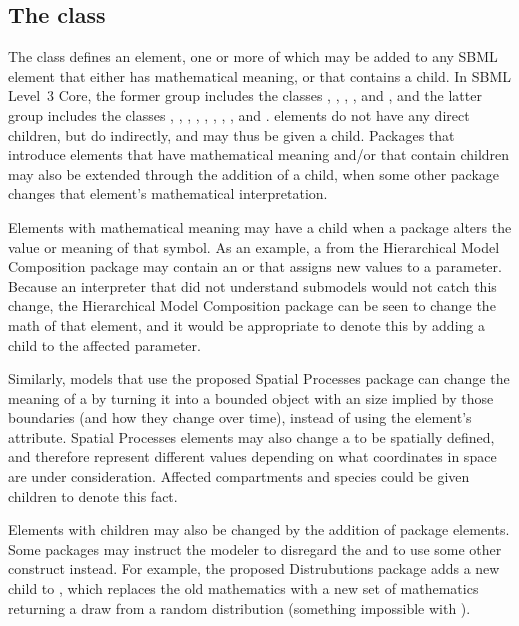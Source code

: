 \subsection{The  class}
\label{changedMath-class}

The \ChangedMath class defines an element, one or more of which may be added to any SBML element that either has mathematical meaning, or that contains a \Math child.  In SBML Level~3 Core, the former group includes the classes \Compartment, \Parameter, \Reaction, \Species, and \SpeciesReference, and the latter group includes the classes \Constraint, \Delay, \EventAssignment, \FunctionDefinition, \InitialAssignment, \KineticLaw, \Priority, \Rule, and \Trigger.  \Event elements do not have any direct \Math children, but do indirectly, and may thus be given a \ChangedMath child.  Packages that introduce elements that have mathematical meaning and/or that contain \Math children may also be extended through the addition of a \ChangedMath child, when some other package changes that element's mathematical interpretation.

Elements with mathematical meaning may have a \ChangedMath child when a package alters the value or meaning of that symbol.  As an example, a \Submodel from the Hierarchical Model Composition package may contain an \Event or \Rule that assigns new values to a parameter.  Because an interpreter that did not understand submodels would not catch this change, the Hierarchical Model Composition package can be seen to change the math of that element, and it would be appropriate to denote this by adding a \ChangedMath child to the affected parameter.

Similarly, models that use the proposed Spatial Processes package can change the meaning of a \Compartment by turning it into a bounded object with an size implied by those boundaries (and how they change over time), instead of using the element's  attribute.  Spatial Processes elements may also change a \Species to be spatially defined, and therefore represent different values depending on what coordinates in space are under consideration.  Affected compartments and species could be given \ChangedMath children to denote this fact.

Elements with \Math children may also be changed by the addition of package elements.  Some packages may instruct the modeler to disregard the \Math and to use some other construct instead.  For example, the proposed Distrubutions package adds a new child to \FunctionDefinition, which replaces the old mathematics with a new set of mathematics returning a draw from a random distribution (something impossible with \Math).

